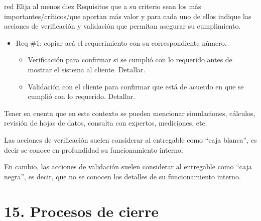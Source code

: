 \documentclass[
11pt, %
]{charter}
\begin{document}
\begin{consigna}{red}
  Elija al menos diez Requisitos que a su criterio sean los más importantes/críticos/que aportan más valor y para cada uno de ellos indique las acciones de verificación y validación que permitan asegurar su cumplimiento.

  \begin{itemize}
    \item Req \#1: copiar acá el requerimiento con su correspondiente número.

          \begin{itemize}
            \item Verificación para confirmar si se cumplió con lo requerido antes de mostrar el sistema al cliente. Detallar.
            \item Validación con el cliente para confirmar que está de acuerdo en que se cumplió con lo requerido. Detallar.
          \end{itemize}

  \end{itemize}

  Tener en cuenta que en este contexto se pueden mencionar simulaciones, cálculos, revisión de hojas de datos, consulta con expertos, mediciones, etc.

  Las acciones de verificación suelen considerar al entregable como ``caja blanca'', es decir se conoce en profundidad su funcionamiento interno.

  En cambio, las acciones de validación suelen considerar al entregable como ``caja negra'', es decir, que no se conocen los detalles de su funcionamiento interno.

\end{consigna}

\section{15. Procesos de cierre}
\label{sec:cierre}
\end{document}
